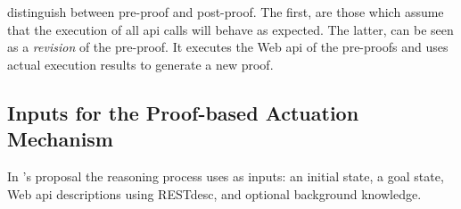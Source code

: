 \citeauthor{verborgh_ijcs_2014} distinguish between pre-proof and post-proof.
The first, are those which assume that the execution of all \acs{api} calls will behave as expected.
The latter, can be seen as a \emph{revision} of the pre-proof.
It executes the Web \acs{api} of the pre-proofs and uses actual execution results to generate a new proof.



\subsection{Inputs for the Proof-based Actuation Mechanism}
\label{sec:inputs_proof}

In \citet{verborgh_ijcs_2014}'s proposal the reasoning process uses as inputs:
an initial state,
a goal state,
Web \ac{api} descriptions using RESTdesc, and
optional background knowledge.


